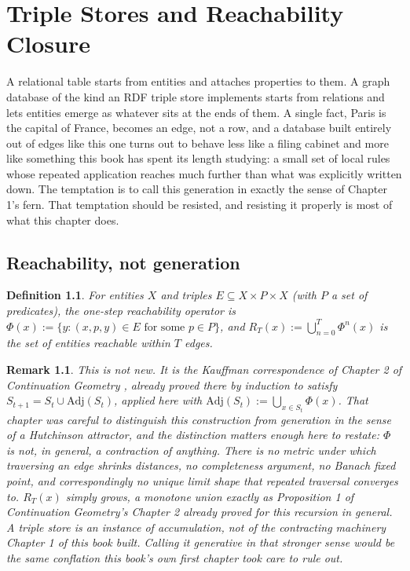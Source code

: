 \documentclass[11pt]{report}
\newtheorem{definition}{Definition}[chapter]
\newtheorem{remark}{Remark}[chapter]
\begin{document}
\chapter{Triple Stores and Reachability Closure}

A relational table starts from entities and attaches properties to
them. A graph database of the kind an RDF triple store implements
starts from relations and lets entities emerge as whatever sits at
the ends of them. A single fact, Paris is the capital of France,
becomes an edge, not a row, and a database built entirely out of
edges like this one turns out to behave less like a filing cabinet
and more like something this book has spent its length studying: a
small set of local rules whose repeated application reaches much
further than what was explicitly written down. The temptation is to
call this generation in exactly the sense of Chapter 1's fern. That
temptation should be resisted, and resisting it properly is most of
what this chapter does.

\section*{Reachability, not generation}

\begin{definition}
For entities $X$ and triples $E \subseteq X \times P \times X$ (with
$P$ a set of predicates), the one-step reachability operator is
$\Phi(x) := \{y : (x,p,y) \in E \text{ for some } p \in P\}$, and
$R_T(x) := \bigcup_{n=0}^{T} \Phi^n(x)$ is the set of entities
reachable within $T$ edges.
\end{definition}

\begin{remark}
This is not new. It is the Kauffman correspondence of Chapter 2 of
\emph{Continuation Geometry} \cite{kauffman2000}, already proved there
by induction to satisfy $S_{t+1} = S_t \cup \mathrm{Adj}(S_t)$, applied
here with $\mathrm{Adj}(S_t) := \bigcup_{x \in S_t} \Phi(x)$. That
chapter was careful to distinguish this construction from generation
in the sense of a Hutchinson attractor, and the distinction matters
enough here to restate: $\Phi$ is not, in general, a contraction of
anything. There is no metric under which traversing an edge shrinks
distances, no completeness argument, no Banach fixed point, and
correspondingly no unique limit shape that repeated traversal
converges to. $R_T(x)$ simply grows, a monotone union exactly as
Proposition 1 of \emph{Continuation Geometry}'s Chapter 2 already
proved for this recursion in general. A triple store is an instance
of accumulation, not of the contracting machinery Chapter 1 of this
book built. Calling it generative in that stronger sense would be the
same conflation this book's own first chapter took care to rule out.
\end{remark}
\end{document}
